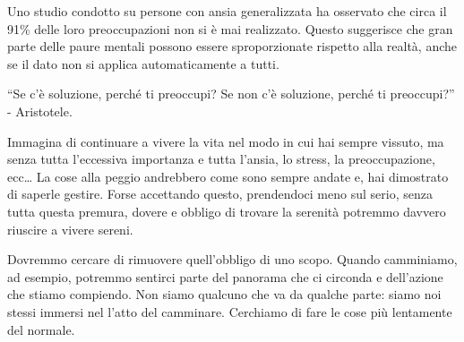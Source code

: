 \documentclass[12pt]{book} %
\begin{document}
Uno studio condotto su persone con ansia generalizzata ha osservato che circa il 91\% delle loro preoccupazioni non si è mai realizzato. Questo suggerisce che gran parte delle paure mentali possono essere sproporzionate rispetto alla realtà, anche se il dato non si applica automaticamente a tutti.

“Se c'è soluzione, perché ti preoccupi? Se non c'è soluzione, perché ti preoccupi?” - Aristotele.

Immagina di continuare a vivere la vita nel modo in cui hai sempre vissuto, ma senza tutta l'eccessiva importanza e tutta l'ansia, lo stress, la preoccupazione, ecc… La cose alla peggio andrebbero come sono sempre andate e, hai dimostrato di saperle gestire. Forse accettando questo, prendendoci meno sul serio, senza tutta questa premura, dovere e obbligo di trovare la serenità potremmo davvero riuscire a vivere sereni.

Dovremmo cercare di rimuovere quell'obbligo di uno scopo. Quando camminiamo, ad esempio, potremmo sentirci parte del panorama che ci circonda e dell'azione che stiamo compiendo.
Non siamo qualcuno che va da qualche parte: siamo noi stessi immersi nel l'atto del camminare. 
Cerchiamo di fare le cose più lentamente del normale.
\end{document}
